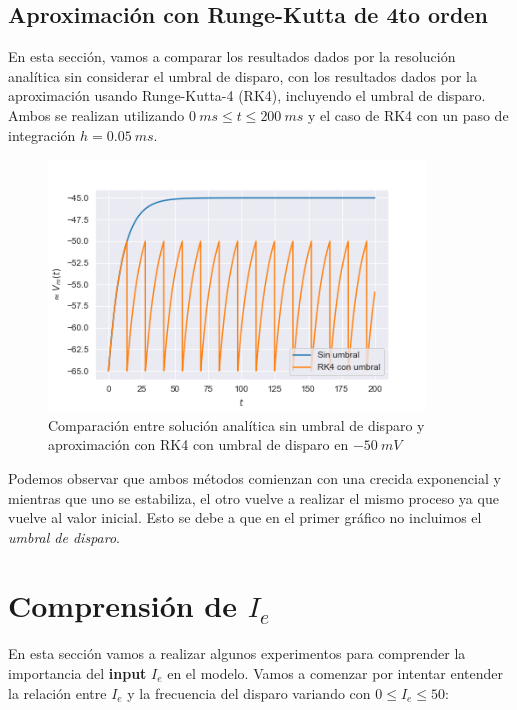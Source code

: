 \documentclass [a4paper,12pt,oneside,final]{article}
\begin{document}
\pagebreak
\subsection{Aproximación con Runge-Kutta de 4to orden}

En esta sección, vamos a comparar los resultados dados por la resolución analítica sin considerar el umbral de disparo, con los resultados dados por la aproximación usando Runge-Kutta-4 (RK4), incluyendo el umbral de disparo. Ambos se realizan utilizando $ 0 \ ms \leq t \leq 200 \ ms $ y el caso de RK4 con un paso de integración $ h = 0.05 \ ms $.

\begin{figure}[ht]
  \centering
  \includegraphics[width=10cm,keepaspectratio]{./diagramas/grafico_b.png}
  \caption{Comparación entre solución analítica sin umbral de disparo y aproximación con RK4 con umbral de disparo en $-50 \ mV$}
\end{figure}

Podemos observar que ambos métodos comienzan con una crecida exponencial y mientras que uno se estabiliza, el otro vuelve a realizar el mismo proceso ya que vuelve al valor inicial. Esto se debe a que en el primer gráfico no incluimos el {\it umbral de disparo}. 

\section{Comprensión de $I_e$}

En esta sección vamos a realizar algunos experimentos para comprender la importancia del {\bf input} $I_e$ en el modelo. Vamos a comenzar por intentar entender la relación entre $I_e$ y la frecuencia del disparo variando con $ 0 \leq I_e \leq 50  $:
\end{document}
